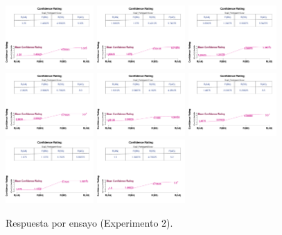 \begin{figure}[th]
\includegraphics[width=0.30\textwidth]{Figures/MirrorRating_Exp2_P13} \includegraphics[width=0.30\textwidth]{Figures/MirrorRating_Exp2_P14} \includegraphics[width=0.30\textwidth]{Figures/MirrorRating_Exp2_P15}
\includegraphics[width=0.30\textwidth]{Figures/MirrorRating_Exp2_P16} \includegraphics[width=0.30\textwidth]{Figures/MirrorRating_Exp2_P17} \includegraphics[width=0.30\textwidth]{Figures/MirrorRating_Exp2_P18}
\includegraphics[width=0.30\textwidth]{Figures/MirrorRating_Exp2_P19} \includegraphics[width=0.30\textwidth]{Figures/MirrorRating_Exp2_P20} 
\caption[Response_Exp2]{Respuesta por ensayo (Experimento 2).}
\label{fig:Response_E2}
\end{figure}


